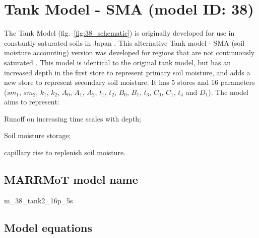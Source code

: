 \section{Tank Model - SMA (model ID: 38)}
The Tank Model (fig.~\ref{fig:38_schematic}) is originally developed for use in constantly saturated soils in Japan \citep{Sugawara1979}. This alternative Tank model - SMA (soil moisture accounting) version was developed for regions that are not continuously saturated \citep{Sugawara1995}. This model is identical to the original tank model, but has an increased depth in the first store to represent primary soil moisture, and adds a new store to represent secondary soil moisture. It has 5 stores and 16 parameters ($sm_1$, $sm_2$, $k_1$, $k_2$, $A_0$, $A_1$, $A_2$, $t_1$, $t_2$, $B_0$, $B_1$, $t_3$, $C_0$, $C_1$, $t_4$ and $D_1$). The model aims to represent:

\begin{itemizecompact}
\item Runoff on increasing time scales with depth;
\item Soil moisture storage;
\item capillary rise to replenish soil moisture.
\end{itemizecompact}

\subsection{MARRMoT model name}
m\_38\_tank2\_16p\_5s \\

\subsection{Model equations}

